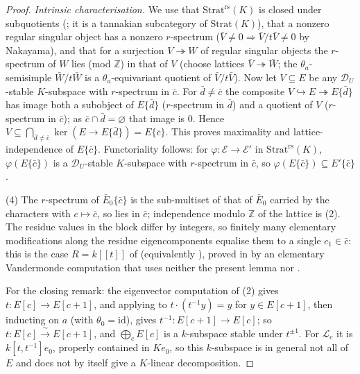 \documentclass[11pt,reqno]{amsart}
\newcommand{\ZZ}{\mathbb{Z}}
\newcommand{\cD}{\mathcal{D}}
\newcommand{\cE}{\mathcal{E}}
\newcommand{\cL}{\mathcal{L}}
\newcommand{\Strat}{\mathrm{Strat}}
\newcommand{\rs}{\mathrm{rs}}
\newcommand{\id}{\mathrm{id}}
\newcommand{\isoto}{\xrightarrow{\ \sim\ }}
\theoremstyle{plain}
\theoremstyle{definition}
\theoremstyle{remark}
\numberwithin{equation}{section}
\begin{document}
\begin{proof}
\emph{Intrinsic characterisation.}  We use that $\Strat^{\rs}(K)$ is
closed under subquotients (\cite{Kindler}; it is a tannakian subcategory
of $\Strat(K)$), that a nonzero regular singular object has a
nonzero $r$-spectrum ($\bar V\ne0\Rightarrow\bar V/t\bar V\ne0$ by
Nakayama), and that for a surjection $V\twoheadrightarrow W$ of
regular singular objects the $r$-spectrum of $W$ lies (mod $\ZZ$) in that
of $V$ (choose lattices $\bar V\twoheadrightarrow\bar W$; the
$\theta_a$-semisimple $\bar W/t\bar W$ is a $\theta_a$-equivariant
quotient of $\bar V/t\bar V$).  Now let $V\subseteq E$ be any
$\cD_U$-stable $K$-subspace with $r$-spectrum in $\bar c$.  For
$\bar d\ne\bar c$ the composite $V\hookrightarrow E\twoheadrightarrow
E\{\bar d\}$ has image both a subobject of $E\{\bar d\}$ ($r$-spectrum in
$\bar d$) and a quotient of $V$ ($r$-spectrum in $\bar c$); as
$\bar c\cap\bar d=\varnothing$ that image is $0$.  Hence
$V\subseteq\bigcap_{\bar d\ne\bar c}\ker(E\to E\{\bar d\})=E\{\bar c\}$.
This proves maximality and lattice-independence of $E\{\bar c\}$.
Functoriality follows: for $\varphi\colon\cE\to\cE'$ in $\Strat^{\rs}(K)$,
$\varphi(E\{\bar c\})$ is a $\cD_U$-stable $K$-subspace with $r$-spectrum
in $\bar c$, so $\varphi(E\{\bar c\})\subseteq E'\{\bar c\}$.

(4) The $r$-spectrum of $\bar E_0\{\bar c\}$ is the sub-multiset of that
of $\bar E_0$ carried by the characters with $c\mapsto\bar c$, so lies in
$\bar c$; independence modulo $\ZZ$ of the lattice is
(2).  The residue values in the block differ by
integers, so finitely many elementary modifications along the residue
eigencomponents equalise them to a single $c_1\in\bar c$: this is the
case $R=k[[t]]$ of  (equivalently ),
proved in  by an elementary Vandermonde computation
that uses neither the present lemma nor .

For the closing remark: the eigenvector computation of (2) gives
$t\colon E[c]\to E[c+1]$, and applying  to
$t\cdot(t^{-1}y)=y$ for $y\in E[c+1]$, then inducting on $a$ (with
$\theta_0=\id$), gives $t^{-1}\colon E[c+1]\to E[c]$; so
$t\colon E[c]\isoto E[c+1]$, and $\bigoplus_cE[c]$ is a $k$-subspace
stable under $t^{\pm1}$.  For $\cL_c$ it is $k[t,t^{-1}]e_0$, properly
contained in $Ke_0$, so this $k$-subspace is in general not all of $E$
and does not by itself give a $K$-linear decomposition.
\end{proof}
\end{document}

